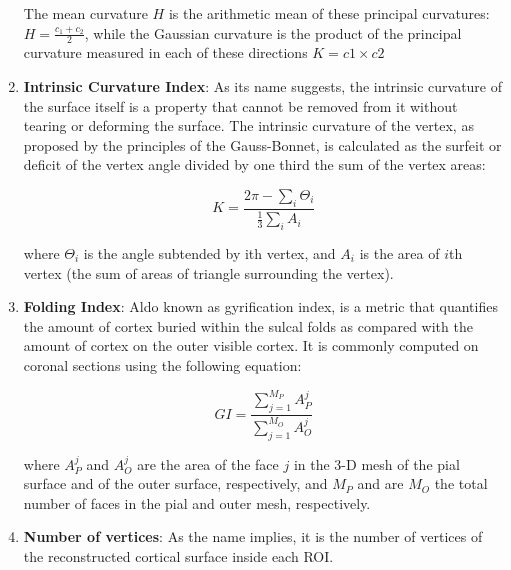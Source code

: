 \documentclass{cys}
\begin{document}
\begin{enumerate}
The mean curvature $H$ is the arithmetic mean of these principal curvatures: $H=\frac{c_1+c_2}{2}$, while the Gaussian curvature is  the product of the principal curvature measured in each of these directions $K = c1 \times c2$

\item \textbf{Intrinsic Curvature Index}: As its name suggests, the intrinsic curvature of the surface itself is a property that cannot be removed from it without tearing or deforming the surface. The intrinsic curvature of the vertex, as proposed by  the principles of the Gauss-Bonnet, is calculated as the surfeit or deficit of the vertex angle divided by one third the sum of the vertex areas:

\begin{equation}
K=\frac{2\pi-\sum_i\Theta_i}{\frac{1}{3}\sum_iA_i}
\end{equation}

where $\Theta_i$ is the angle subtended by ith vertex, and $A_i$
is the area of $i$th vertex (the sum of areas of triangle
surrounding the vertex).

\item \textbf{Folding Index}: Aldo known as gyrification index, is a metric that quantifies the amount of cortex buried within the sulcal folds as compared with the amount of cortex on the outer visible cortex. It is commonly computed on coronal sections using the following equation:

\begin{equation}
GI=\frac{\sum_{j=1}^{M_P}A_P^j}{\sum_{j=1}^{M_O}A_O^j}
\end{equation}

where $A_P^j$ and $A_O^j$ are the area of the face $j$ in the 3-D mesh
of the pial surface and of the outer surface, respectively, and $M_P$ and are $M_O$ the total number of faces in the pial and outer mesh, respectively.

\item \textbf{Number of vertices}: As the name implies, it is the number of vertices of the reconstructed cortical surface inside each ROI.


\end{enumerate}
\bigskip
\end{document}
